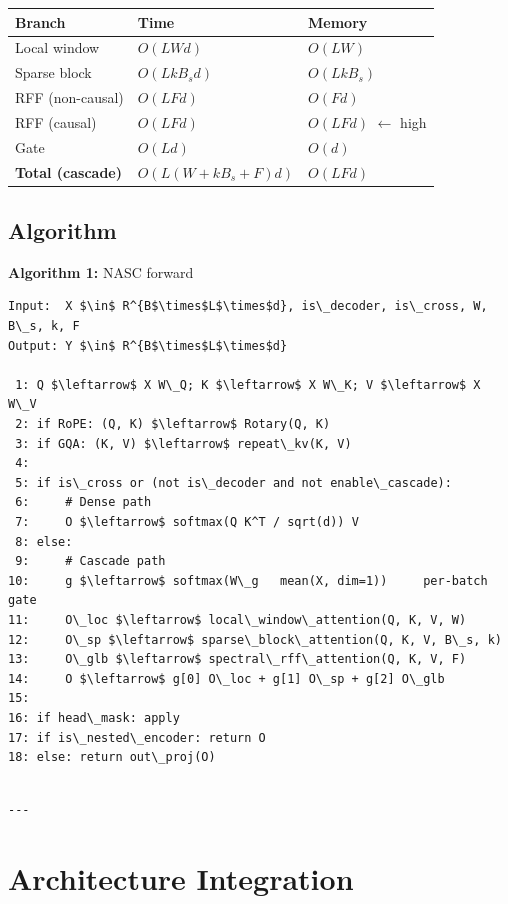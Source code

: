 \begin{table}[H]
\centering
\small
\begin{tabular}{lll}
\toprule
\textbf{Branch} & \textbf{Time} & \textbf{Memory} \\
\midrule
Local window & $O(L W d)$ & $O(L W)$ \\
Sparse block & $O(L k B_s d)$ & $O(L k B_s)$ \\
RFF (non-causal) & $O(L F d)$ & $O(F d)$ \\
RFF (causal) & $O(L F d)$ & $O(L F d)$ $\leftarrow$ high \\
Gate & $O(L d)$ & $O(d)$ \\
\textbf{Total (cascade)} & $O(L(W + k B_s + F) d)$ & $O(L F d)$ \\
\bottomrule
\end{tabular}
\end{table}

\subsection{Algorithm}

\textbf{Algorithm 1:} NASC forward
\begin{lstlisting}
Input:  X $\in$ R^{B$\times$L$\times$d}, is\_decoder, is\_cross, W, B\_s, k, F
Output: Y $\in$ R^{B$\times$L$\times$d}

 1: Q $\leftarrow$ X W\_Q; K $\leftarrow$ X W\_K; V $\leftarrow$ X W\_V
 2: if RoPE: (Q, K) $\leftarrow$ Rotary(Q, K)
 3: if GQA: (K, V) $\leftarrow$ repeat\_kv(K, V)
 4:
 5: if is\_cross or (not is\_decoder and not enable\_cascade):
 6:     # Dense path
 7:     O $\leftarrow$ softmax(Q K^T / sqrt(d)) V
 8: else:
 9:     # Cascade path
10:     g $\leftarrow$ softmax(W\_g   mean(X, dim=1))     per-batch gate
11:     O\_loc $\leftarrow$ local\_window\_attention(Q, K, V, W)
12:     O\_sp $\leftarrow$ sparse\_block\_attention(Q, K, V, B\_s, k)
13:     O\_glb $\leftarrow$ spectral\_rff\_attention(Q, K, V, F)
14:     O $\leftarrow$ g[0] O\_loc + g[1] O\_sp + g[2] O\_glb
15:
16: if head\_mask: apply
17: if is\_nested\_encoder: return O
18: else: return out\_proj(O)
\end{lstlisting}
\begin{lstlisting}

---
\end{lstlisting}


\section{Architecture Integration}

